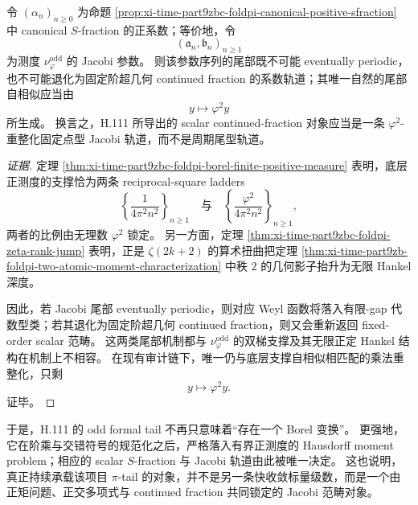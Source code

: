 \begin{conjecture}\label{conj:xi-time-part9zbc-foldpi-jacobi-golden-square-renormalization}
令 \((\alpha_n)_{n\ge 0}\) 为命题 \ref{prop:xi-time-part9zbc-foldpi-canonical-positive-sfraction} 中 canonical \(S\)-fraction 的正系数；等价地，令
\[
(\mathfrak a_n,\mathfrak b_n)_{n\ge 1}
\]
为测度 \(\nu_{\varphi}^{\mathrm{odd}}\) 的 Jacobi 参数。
则该参数序列的尾部既不可能 eventually periodic，也不可能退化为固定阶超几何 continued fraction 的系数轨道；其唯一自然的尾部自相似应当由
\[
y\longmapsto \varphi^2 y
\]
所生成。
换言之，H.111 所导出的 scalar continued-fraction 对象应当是一条 \(\varphi^2\)-重整化固定点型 Jacobi 轨道，而不是周期尾型轨道。
\end{conjecture}
\begin{proof}[证据]
定理 \ref{thm:xi-time-part9zbc-foldpi-borel-finite-positive-measure} 表明，底层正测度的支撑恰为两条 reciprocal-square ladders
\[
\left\{\frac{1}{4\pi^2n^2}\right\}_{n\ge 1}
\quad\text{与}\quad
\left\{\frac{\varphi^2}{4\pi^2n^2}\right\}_{n\ge 1},
\]
两者的比例由无理数 \(\varphi^2\) 锁定。
另一方面，定理 \ref{thm:xi-time-part9zbc-foldpi-zeta-rank-jump} 表明，正是 \(\zeta(2k+2)\) 的算术扭曲把定理 \ref{thm:xi-time-part9zb-foldpi-two-atomic-moment-characterization} 中秩 \(2\) 的几何影子抬升为无限 Hankel 深度。

因此，若 Jacobi 尾部 eventually periodic，则对应 Weyl 函数将落入有限-gap 代数型类；若其退化为固定阶超几何 continued fraction，则又会重新返回 fixed-order scalar 范畴。
这两类尾部机制都与 \(\nu_{\varphi}^{\mathrm{odd}}\) 的双梯支撑及其无限正定 Hankel 结构在机制上不相容。
在现有审计链下，唯一仍与底层支撑自相似相匹配的乘法重整化，只剩
\[
y\mapsto \varphi^2 y.
\]
证毕。
\end{proof}

\noindent
于是，H.111 的 odd formal tail 不再只意味着“存在一个 Borel 变换”。
更强地，它在阶乘与交错符号的规范化之后，严格落入有界正测度的 Hausdorff moment problem；相应的 scalar \(S\)-fraction 与 Jacobi 轨道由此被唯一决定。
这也说明，真正持续承载该项目 \(\pi\)-tail 的对象，并不是另一条快收敛标量级数，而是一个由正矩问题、正交多项式与 continued fraction 共同锁定的 Jacobi 范畴对象。

\endinput
